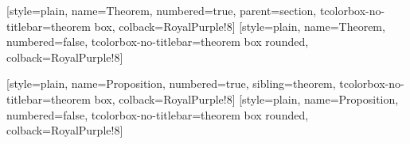 
\usepackage{amsmath,amsthm,amssymb}
\usepackage{mathtools}
\usepackage{mathrsfs}
\usepackage{bm}
\usepackage{extarrows}
\usepackage[a4paper, margin=1in]{geometry}
\usepackage{float}
\usepackage{indentfirst}
\usepackage{booktabs,multirow}
\usepackage[shortlabels,inline]{enumitem}
\usepackage{appendix}

\usepackage[dvipsnames]{xcolor}
\usepackage{pifont}
\usepackage{graphicx}
\graphicspath{
    {./figure/}{./figures/}{./image/}{./images/}{./graphic/}{./graphics/}{./picture/}{./pictures/}
}
\usepackage{subcaption}

\usepackage[ruled,linesnumbered,noline]{algorithm2e}
\usepackage{listings}
\lstset{style=simpleStyle}

\usepackage{hyperref}
\hypersetup{
    colorlinks=true,linkcolor=,urlcolor=cyan
}

\renewcommand*{\proofname}{\normalfont\bfseries Proof}

\usepackage[most]{tcolorbox}
\usepackage{keytheorems}



[style=plain, name=Theorem, numbered=true, parent=section,
    tcolorbox-no-titlebar={theorem box, colback=RoyalPurple!8}]
[style=plain, name=Theorem, numbered=false,
    tcolorbox-no-titlebar={theorem box rounded, colback=RoyalPurple!8}]

[style=plain, name=Proposition, numbered=true, sibling=theorem,
    tcolorbox-no-titlebar={theorem box, colback=RoyalPurple!8}]
[style=plain, name=Proposition, numbered=false,
    tcolorbox-no-titlebar={theorem box rounded, colback=RoyalPurple!8}]

